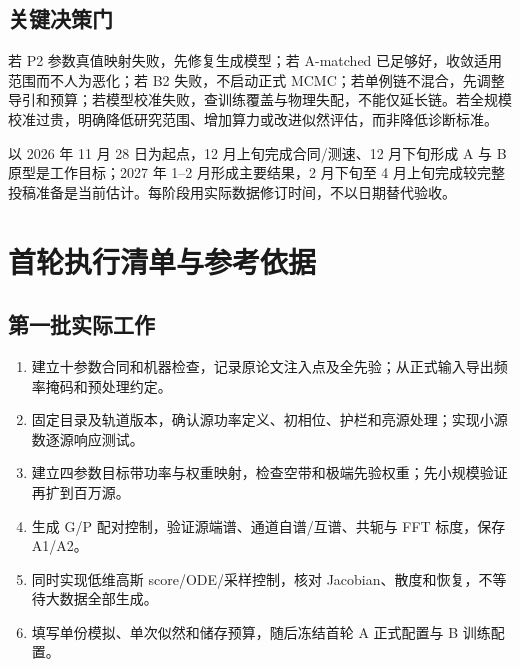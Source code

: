 \documentclass[UTF8,fontset=none,a4paper,11pt]{ctexart}
\newcommand{\chapterpage}[1]{\section{#1}}
\begin{document}
\subsection{关键决策门}
若 P2 参数真值映射失败，先修复生成模型；若 A-matched 已足够好，收敛适用范围而不人为恶化；若 B2 失败，不启动正式 MCMC；若单例链不混合，先调整导引和预算；若模型校准失败，查训练覆盖与物理失配，不能仅延长链。若全规模校准过贵，明确降低研究范围、增加算力或改进似然评估，而非降低诊断标准。
\par 以 2026 年 11 月 28 日为起点，12 月上旬完成合同/测速、12 月下旬形成 A 与 B 原型是工作目标；2027 年 1--2 月形成主要结果，2 月下旬至 4 月上旬完成较完整投稿准备是当前估计。每阶段用实际数据修订时间，不以日期替代验收。
\chapterpage{首轮执行清单与参考依据}
\subsection{第一批实际工作}
\begin{enumerate}
\item 建立十参数合同和机器检查，记录原论文注入点及全先验；从正式输入导出频率掩码和预处理约定。
\item 固定目录及轨道版本，确认源功率定义、初相位、护栏和亮源处理；实现小源数逐源响应测试。
\item 建立四参数目标带功率与权重映射，检查空带和极端先验权重；先小规模验证再扩到百万源。
\item 生成 G/P 配对控制，验证源端谱、通道自谱/互谱、共轭与 FFT 标度，保存 A1/A2。
\item 同时实现低维高斯 score/ODE/采样控制，核对 Jacobian、散度和恢复，不等待大数据全部生成。
\item 填写单份模拟、单次似然和储存预算，随后冻结首轮 A 正式配置与 B 训练配置。
\end{enumerate}
\end{document}
